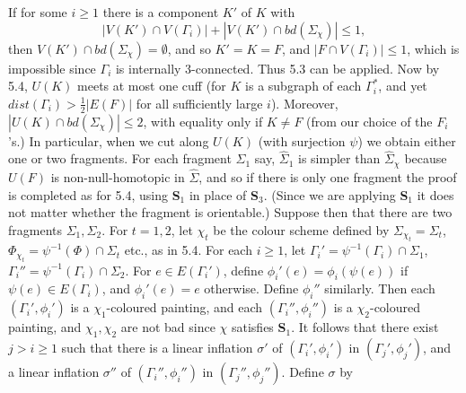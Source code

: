 If for some $i \ge 1$ there is a component $K'$ of $K$ with
\begin{equation*}
|V(K') \cap V(\Gamma_i)| + |V(K') \cap bd(\Sigma_\chi)| \le 1,
\end{equation*}
then $V(K') \cap bd(\Sigma_\chi) = \emptyset$, and so $K' = K = F$, and $|F \cap V(\Gamma_i)| \le 1$, which is impossible since $\Gamma_i$ is internally 3-connected. Thus 5.3 can be applied. Now by 5.4, $U(K)$ meets at most one cuff (for $K$ is a subgraph of each $\Gamma_i^*$, and yet $dist(\Gamma_i) > \frac{1}{2}|E(F)|$ for all sufficiently large $i$). Moreover, $|U(K) \cap bd(\Sigma_\chi)| \le 2$, with equality only if $K \ne F$ (from our choice of the $F_i$'s.) In particular, when we cut along $U(K)$ (with surjection $\psi$) we obtain either one or two fragments. For each fragment $\Sigma_1$ say, $\hat{\Sigma}_1$ is simpler than $\hat{\Sigma}_\chi$ because $U(F)$ is non-null-homotopic in $\hat{\Sigma}$, and so if there is only one fragment the proof is completed as for 5.4, using \textbf{S}$_1$ in place of \textbf{S}$_3$. (Since we are applying \textbf{S}$_1$ it does not matter whether the fragment is orientable.) Suppose then that there are two fragments $\Sigma_1, \Sigma_2$. For $t = 1, 2$, let $\chi_t$ be the colour scheme defined by $\Sigma_{\chi_t} = \Sigma_t$, $\Phi_{\chi_t} = \psi^{-1}(\Phi) \cap \Sigma_t$ etc., as in 5.4. For each $i \ge 1$, let $\Gamma_i' = \psi^{-1}(\Gamma_i) \cap \Sigma_1$, $\Gamma_i'' = \psi^{-1}(\Gamma_i) \cap \Sigma_2$. For $e \in E(\Gamma_i')$, define $\phi_i'(e) = \phi_i(\psi(e))$ if $\psi(e) \in E(\Gamma_i)$, and $\phi_i'(e) = e$ otherwise. Define $\phi_i''$ similarly. Then each $(\Gamma_i', \phi_i')$ is a $\chi_1$-coloured painting, and each $(\Gamma_i'', \phi_i'')$ is a $\chi_2$-coloured painting, and $\chi_1, \chi_2$ are not bad since $\chi$ satisfies \textbf{S}$_1$. It follows that there exist $j > i \ge 1$ such that there is a linear inflation $\sigma'$ of $(\Gamma_i', \phi_i')$ in $(\Gamma_j', \phi_j')$, and a linear inflation $\sigma''$ of $(\Gamma_i'', \phi_i'')$ in $(\Gamma_j'', \phi_j'')$.  Define $\sigma$ by
